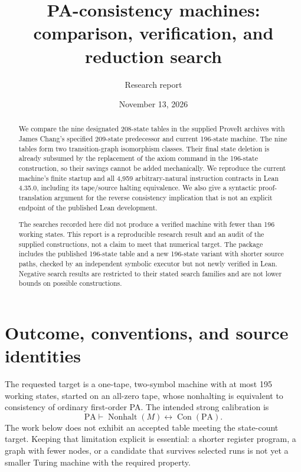 \documentclass[11pt,letterpaper]{article}
\title{PA-consistency machines:\\comparison, verification, and reduction search}
\author{Research report}
\date{November 13, 2026}
\newcommand{\PA}{\mathrm{PA}}
\newcommand{\Con}{\operatorname{Con}}
\newcommand{\NH}{\operatorname{Nonhalt}}
\begin{document}
\maketitle
\begin{abstract}
We compare the nine designated 208-state tables in the supplied ProveIt
archives with James Chang's specified 209-state predecessor and current
196-state machine. The nine tables form two transition-graph isomorphism
classes. Their final state deletion is already subsumed by the replacement
of the axiom command in the 196-state construction, so their savings cannot
be added mechanically. We reproduce the current machine's finite startup
and all 4,959 arbitrary-natural instruction contracts in Lean 4.35.0,
including its tape/source halting equivalence. We also give a syntactic
proof-translation argument for the reverse consistency implication that
is not an explicit endpoint of the published Lean development.

The searches recorded here did not produce a verified machine with fewer
than 196 working states. This report is a reproducible research result and
an audit of the supplied constructions, not a claim to meet that numerical
target. The package includes the published 196-state table and a new
196-state variant with shorter source paths, checked by an independent
symbolic executor but not newly verified in Lean. Negative search results
are restricted to their stated search
families and are not lower bounds on possible constructions.
\end{abstract}
\tableofcontents

\section{Outcome, conventions, and source identities}
\label{sec:outcome}

The requested target is a one-tape, two-symbol machine with at most 195
working states, started on an all-zero tape, whose nonhalting is equivalent
to consistency of ordinary first-order PA. The intended strong calibration is
\begin{equation}\label{eq:target}
 \PA\vdash \NH(M)\leftrightarrow\Con(\PA).
\end{equation}
The work below does not exhibit an accepted table meeting the state-count
target. Keeping that limitation explicit is essential: a shorter register
program, a graph with fewer nodes, or a candidate that survives selected
runs is not yet a smaller Turing machine with the required property.
\end{document}
